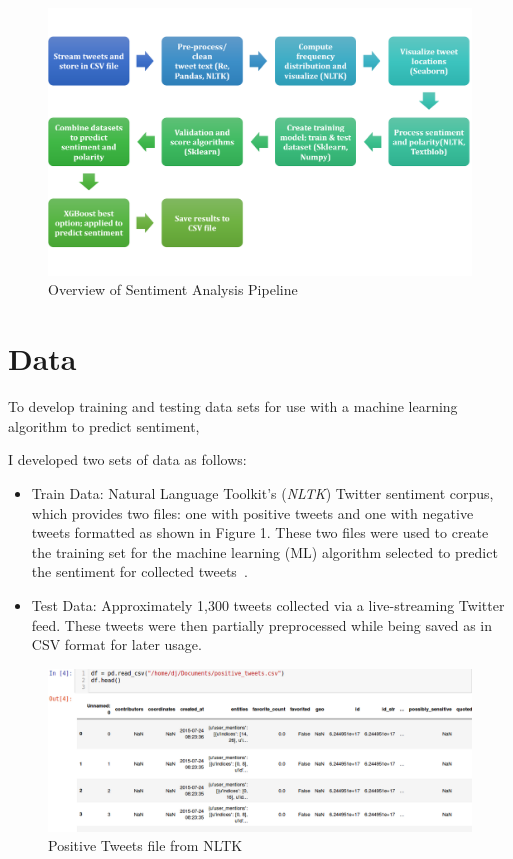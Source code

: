 \begin{figure}[H]
\centering
\includegraphics[width=\columnwidth]{images/sentiment_analysis_pipeline.png}
\caption{Overview of Sentiment Analysis Pipeline}
\label{fig:pipeline}
\end{figure}

\section{Data} 

To develop training and testing data sets for use
with a machine learning algorithm to predict
sentiment, 


I developed two sets of data as follows:

\begin{itemize}
\item Train Data:  Natural Language Toolkit's
(\emph{NLTK}) Twitter sentiment corpus, which
provides two files:  one with positive tweets and one
with negative tweets formatted as shown in Figure 1.
These two files were used to create the training set
for the machine learning (ML) algorithm selected to
predict the sentiment for collected tweets~\cite{twitter14}.

\item Test Data:  Approximately 1,300 tweets collected via a
live-streaming Twitter feed.  These tweets were then partially
preprocessed while being saved as in CSV format for later usage.
\end{itemize}

\begin{figure}[H]
\centering
\includegraphics[width=\columnwidth]{images/screenshot_positive.png}
\caption{Positive Tweets file from NLTK}
\label{fig:positive}
\end{figure} 

